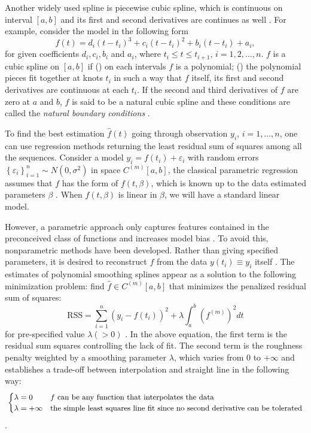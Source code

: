 Another widely used spline is piecewise cubic spline, which is continuous on interval $[a,b]$ and its first and second derivatives are continues as well \cite{wolberg1988cubic}. For example, consider the model in the following form 
\begin{equation*}
f(t)=d_i(t-t_i)^3+c_i(t-t_i)^2+b_i(t-t_i)+a_i,
\end{equation*}
for given coefficients $d_i, c_i, b_i$ and $a_i$, where $t_i\leq t\leq t_{i+1}$, $i=1,2,\ldots,n$. $f$ is a cubic spline on $[a,b]$ if () on each intervals $f$ is a polynomial; () the polynomial pieces fit together at knots $t_i$ in such a way that $f$ itself, its first and second derivatives are continuous at each $t_i$. If the second and third derivatives of $f$ are zero at $a$ and $b$, $f$ is said to be a natural cubic spline and these conditions are called the \textit{natural boundary conditions} \cite{green1993nonparametric}. 


To find the best estimation $\hat{f}(t)$ going through observation $y_i$, $i=1,\ldots,n$, one can use regression methods returning the least residual sum of squares among all the sequences. Consider a model $y_i=f(t_i)+\varepsilon_i$ with random errors $\left\lbrace \varepsilon_i\right\rbrace_{i=1}^n \sim N(0,\sigma^2)$ in space $\mathit{C}^{(m)}[a,b]$, the classical parametric regression assumes that $f$ has the form of $f(t,\beta)$, which is known up to the data estimated parameters $\beta$ \cite{kim2004smoothing}. When $f(t,\beta)$ is linear in $\beta$, we will have a standard linear model. 


However, a parametric approach only captures features contained in the preconceived class of functions and increases model bias \cite{yao2005functional}. To avoid this, nonparametric methods have been developed. Rather than giving specified parameters, it is desired to reconstruct $f$ from the data $y(t_i)\equiv y_i$ itself  \cite{craven1978smoothing}. The estimates of polynomial smoothing splines appear as a solution to the following minimization problem: find $\hat{f} \in \mathit{C}^{(m)}[a,b]$ that minimizes the penalized residual sum of squares: 
\begin{equation}\label{introSmoothingOb}
\mbox{RSS}=\sum_{i=1}^{n}\left(  y_i-f(t_i)\right) ^2+\lambda\int_a^b \left(f^{(m)}\right)^2 dt
\end{equation}
for pre-specified value $\lambda(>0)$ \cite{aydin2012smoothing}. In the above equation, the first term is the residual sum squares controlling the lack of fit. The second term is the roughness penalty weighted by a smoothing parameter $\lambda$, which varies from $0$ to $+\infty$ and establishes a trade-off between interpolation and straight line in the following way: 
\begin{align*}\small 
\begin{cases}
\lambda = 0  & \mbox{$f$ can be any function that interpolates the data}\\
\lambda = +\infty & \mbox{the simple least squares line fit since no second derivative can be tolerated}\\
\end{cases}
\end{align*}\cite{esl2009}. 

